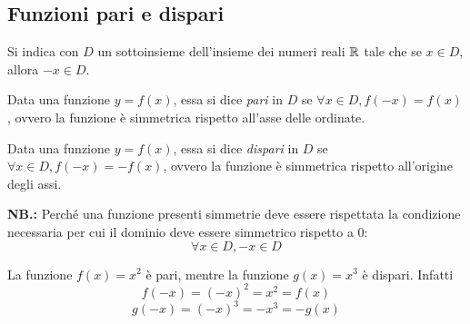 \documentclass{article}     %
\begin{document}
    \subsection{Funzioni pari e dispari}
        Si indica con $D$ un sottoinsieme dell'insieme dei numeri reali $\mathbb{R}$ tale che se $x\in D$, allora $-x \in D$.
        \begin{definition}
            Data una funzione $y=f(x)$, essa si dice \textit{pari} in $D$ se $\forall x \in D, f(-x)=f(x)$, ovvero la funzione è simmetrica rispetto all'asse delle ordinate.
        \end{definition}
        \begin{definition}
            Data una funzione $y=f(x)$, essa si dice \textit{dispari} in $D$ se $\forall x \in D, f(-x)=-f(x)$, ovvero la funzione è simmetrica rispetto all'origine degli assi.
        \end{definition}
        \textbf{NB.:} Perché una funzione presenti simmetrie deve essere rispettata la condizione necessaria per cui il dominio deve essere simmetrico rispetto a $0$: \[\forall x \in D, -x\in D\]
        \begin{ex}
            La funzione $f(x)=x^2$ è pari, mentre la funzione $g(x)=x^3$ è dispari. Infatti \[f(-x)=(-x)^2=x^2=f(x)\] \[g(-x)=(-x)^3=-x^3=-g(x)\]
        \end{ex}
\end{document}
